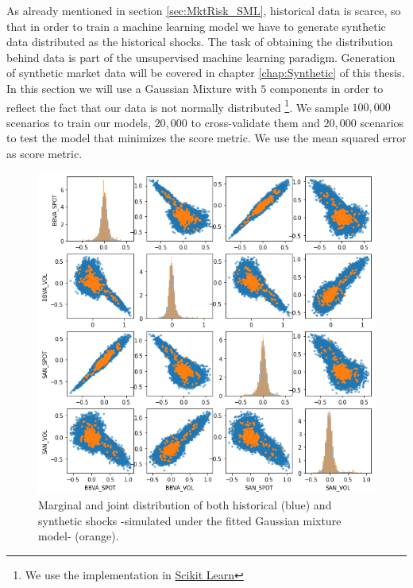As already mentioned in section \ref{sec:MktRisk_SML}, historical data is scarce, so that in order to train a machine learning model we have to generate synthetic data distributed as the historical shocks. The task of obtaining the distribution behind data is part of the unsupervised machine learning paradigm. Generation of synthetic market data will be covered in chapter \ref{chap:Synthetic} of this thesis. In this section we will use a Gaussian Mixture with $5$ components in order to reflect the fact that our data is not normally distributed \footnote{We use the implementation in \href{https://scikit-learn.org/stable/modules/generated/sklearn.mixture.GaussianMixture.html}{Scikit Learn}}. We sample $100,000$ scenarios to train our models, $20,000$ to cross-validate them and $20,000$ scenarios to test the model that minimizes the score metric. We use the mean squared error as score metric.


\begin{figure}[H] 
\centering
\includegraphics[width=1.0\textwidth]{Figures/MarketRisk/GaussMixture.png}
\caption{Marginal and joint distribution of both historical (blue) and synthetic shocks -simulated under the fitted Gaussian mixture model- (orange).}
\label{fig:distrib_P_simul}
\end{figure}

